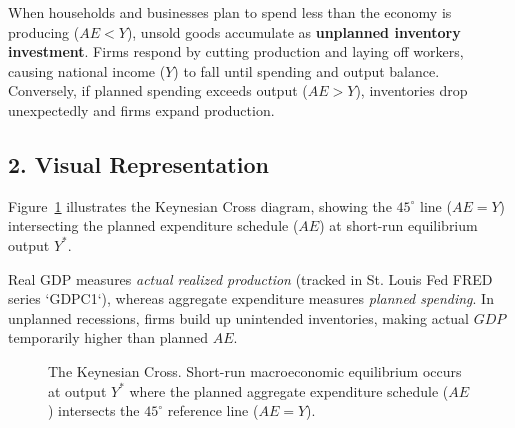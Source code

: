 \documentclass[11pt,letterpaper]{article}
\begin{document}
When households and businesses plan to spend less than the economy is producing ($AE < Y$), unsold goods accumulate as \textbf{unplanned inventory investment}. Firms respond by cutting production and laying off workers, causing national income ($Y$) to fall until spending and output balance. Conversely, if planned spending exceeds output ($AE > Y$), inventories drop unexpectedly and firms expand production.

\subsection*{2. Visual Representation}
Figure~\ref{fig:keynesian_cross} illustrates the Keynesian Cross diagram, showing the $45^\circ$ line ($AE = Y$) intersecting the planned expenditure schedule ($AE$) at short-run equilibrium output $Y^*$.

\begin{tcolorbox}[colback=yellow!10!white,colframe=orange!80!black,title=\textbf{Clear It Up: Real GDP vs. Planned Expenditure}]
Real GDP measures \emph{actual realized production} (tracked in St. Louis Fed FRED series `GDPC1`), whereas aggregate expenditure measures \emph{planned spending}. In unplanned recessions, firms build up unintended inventories, making actual $GDP$ temporarily higher than planned $AE$.
\end{tcolorbox}

\begin{figure}[htbp]
\centering
{}
\caption{The Keynesian Cross. Short-run macroeconomic equilibrium occurs at output $Y^*$ where the planned aggregate expenditure schedule ($AE$) intersects the $45^\circ$ reference line ($AE = Y$).}
\label{fig:keynesian_cross}
\end{figure}
\end{document}
